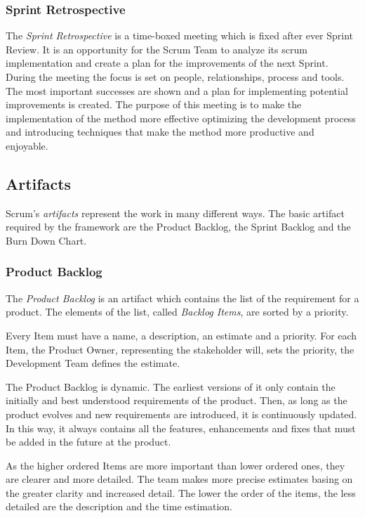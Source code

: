 			\subsubsection{Sprint Retrospective}
			The \emph{Sprint Retrospective} is a time-boxed meeting which is fixed after ever Sprint Review. It is an opportunity for the Scrum Team to analyze its scrum implementation and create a plan for the improvements of the next Sprint. 
			During the meeting the focus is set on people, relationships, process and tools. The most important successes are shown and a plan for implementing potential improvements is created. 
			The purpose of this meeting is to make the implementation of the method more effective optimizing the development process and introducing techniques that make the method more productive and enjoyable. 

		
		\subsection{Artifacts}
			Scrum's \emph{artifacts} represent the work in many different ways. The basic artifact required by the framework are the Product Backlog, the Sprint Backlog and the Burn Down Chart.

			\subsubsection{Product Backlog}
			The \emph{Product Backlog} is an artifact which contains the list of the requirement for a product. The elements of the list, called \emph{Backlog Items}, are sorted by a priority. 

			Every Item must have a name, a description, an estimate and a priority. For each Item, the Product Owner, representing the stakeholder will, sets the priority, the Development Team defines the estimate.

			The Product Backlog is dynamic. The earliest versions of it only contain the initially and best understood requirements of the product. Then, as long as the product evolves and new requirements are introduced, it is continuously updated. In this way, it always contains all the features, enhancements and fixes that must be added in the future at the product. 

			As the higher ordered Items are more important than lower ordered ones, they are clearer and more detailed. The team makes more precise estimates basing on the greater clarity and increased detail. The lower the order of the items, the less detailed are the description and the time estimation.
			
